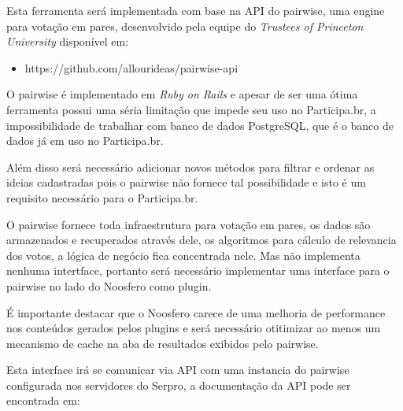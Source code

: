 \documentclass[12pt]{article}
\begin{document}

Esta ferramenta será implementada com base na API do pairwise, uma engine para
votação em pares, desenvolvido pela equipe do {\it Trustees of Princeton
University} disponível em:

\begin{itemize}
  \item https://github.com/allourideas/pairwise-api
\end{itemize}

O pairwise é implementado em {\it Ruby on Rails} e apesar de ser uma ótima
ferramenta possui uma séria limitação que impede seu uso no Participa.br,
a impossibilidade de trabalhar com banco de dados PostgreSQL, que é o banco de
dados já em uso no Participa.br.

Além disso será necessário adicionar novos métodos para filtrar e ordenar as
ideias cadastradas pois o pairwise não fornece tal possibilidade e isto é um
requisito necessário para o Participa.br.


O pairwise fornece toda infraestrutura para votação em pares, os dados são
armazenados e recuperados através dele, os algoritmos para cálculo de
relevancia dos votos, a lógica de negócio fica concentrada nele. Mas não
implementa nenhuma intertface, portanto será necessário implementar uma
interface para o pairwise no lado do Noosfero como plugin.

É importante destacar que o Noosfero carece de uma melhoria de performance nos
conteúdos gerados pelos plugins e será necessário otitimizar ao menos um
mecanismo de cache na aba de resultados exibidos pelo pairwise.

Esta interface irá se comunicar via API com uma instancia do pairwise
configurada nos servidores do Serpro, a documentação da API pode ser
encontrada em:
\end{document}
